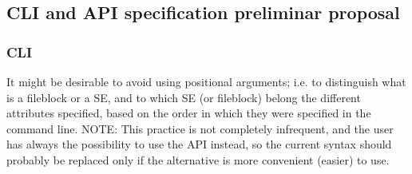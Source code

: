 \documentclass[pdftex]{cmspaper}
\begin{document}
\subsection{CLI and API specification preliminar proposal}
\label{appendix}

\subsubsection{CLI}

It might be desirable to avoid using positional arguments; i.e. to distinguish
what is a fileblock or a SE, and to which SE (or fileblock) belong the different
attributes specified, based on the order in which they were specified in the
command line.
                                                                                                                      NOTE: This practice is not completely infrequent, and the user has always the
possibility to use the API instead, so the current syntax should probably be
replaced only if the alternative is more convenient (easier) to use.
\end{document}

